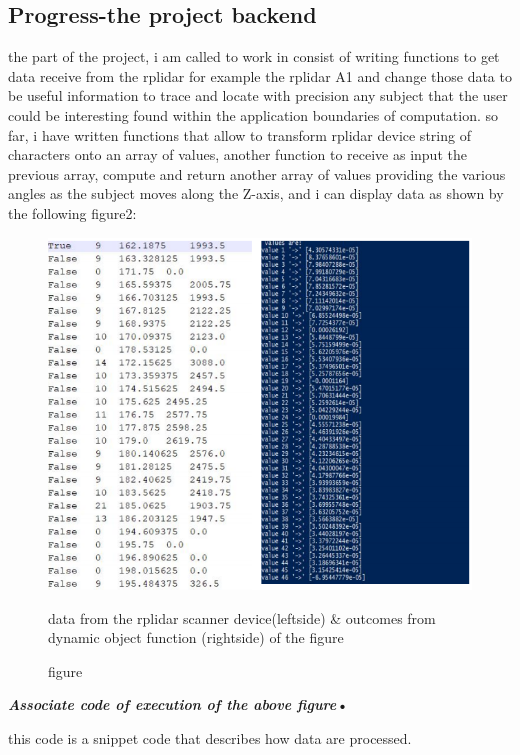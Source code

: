 \documentclass[10pt,draftclsnofoot,onecolumn,journal,compsoc]{IEEEtran}
\begin{document}
\begin{singlespace}
	\subsection{Progress-the project backend}
the part of the project, i am called to work in consist of writing functions to get data receive from the rplidar for example the rplidar A1 and change those data to be useful information to trace and  locate with precision any subject that the user could be interesting found within the application boundaries of computation. so far, i have written functions that allow to transform  rplidar device string of characters onto an array of values, another function to receive as input the previous array, compute and return another array of values providing the various angles as the subject moves along the Z-axis, and i can display data as shown by the following figure2:
\begin{figure}[ht]
    	 \includegraphics[width=6in,natwidth=2000,natheight=200]{images/output.png}
    	\caption{figure}{ data from the rplidar scanner device(leftside) \& outcomes from dynamic object function (rightside) of the figure}
    	\end{figure}
    	
    	\textbf{\textit{Associate code of execution of the above figure}•}
    	
    	this code is a snippet code that describes how data  are processed. 
    	

\end{singlespace}
\end{document}
